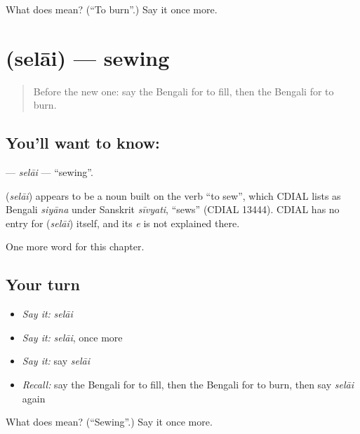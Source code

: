 \begin{tcolorbox}[breakable,colback=teal!4,colframe=teal!35!black,title={Before you move on}]
What does  mean? (\textquotedblleft{}To burn\textquotedblright{}.) Say it once more.
\end{tcolorbox}
\section[\texorpdfstring{\bn{সেলাই} (selāi)}{সেলাই (selāi)}]{ (selāi) — sewing}

\label{lesson:BN-C101-selai}



\begin{quote}
Before the new one: say the Bengali for to fill, then the Bengali for to burn.
\end{quote}

\subsection*{You'll want to know: }
\textbf{} — \emph{selāi} — \textquotedblleft{}sewing\textquotedblright{}.

\begin{cousinweb}
\textbf{} (\emph{selāi}) appears to be a noun built on the verb \textquotedblleft{}to sew\textquotedblright{}, which CDIAL lists as Bengali \emph{siyāna} under Sanskrit \emph{sīvyati}, \textquotedblleft{}sews\textquotedblright{} (CDIAL 13444). CDIAL has no entry for \textbf{} (\emph{selāi}) itself, and its \emph{e} is not explained there.
\end{cousinweb}

\begin{grammarlens}[title={What you've built}]
One more word for this chapter.
\end{grammarlens}

\subsection*{Your turn}
\begin{itemize}
\raggedright
  \item \emph{Say it:} \emph{selāi}
  \item \emph{Say it:} \emph{selāi}, once more
  \item \emph{Say it:} say \emph{selāi}
  \item \emph{Recall:} say the Bengali for to fill, then the Bengali for to burn, then say \emph{selāi} again
\end{itemize}

\begin{tcolorbox}[breakable,colback=teal!4,colframe=teal!35!black,title={Before you move on}]
What does  mean? (\textquotedblleft{}Sewing\textquotedblright{}.) Say it once more.
\end{tcolorbox}

